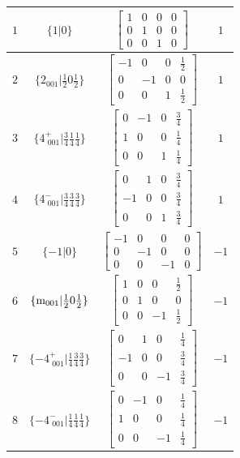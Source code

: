 \documentclass[fleqn,8pt]{jsarticle}
\begin{document}
\begin{longtable}{cccc}
$ 1 $ & $ \{1|0\} $ & $ \begin{bmatrix} 1 & 0 & 0 & 0 \\ 0 & 1 & 0 & 0 \\ 0 & 0 & 1 & 0 \end{bmatrix} $ & $ 1 $ \\ \hline
$ 2 $ & $ \{2{}_{001}|\frac{1}{2} 0 \frac{1}{2}\} $ & $ \begin{bmatrix} -1 & 0 & 0 & \frac{1}{2} \\ 0 & -1 & 0 & 0 \\ 0 & 0 & 1 & \frac{1}{2} \end{bmatrix} $ & $ 1 $ \\ \hline
$ 3 $ & $ \{4^{+}_{\,\,001}|\frac{3}{4} \frac{1}{4} \frac{1}{4}\} $ & $ \begin{bmatrix} 0 & -1 & 0 & \frac{3}{4} \\ 1 & 0 & 0 & \frac{1}{4} \\ 0 & 0 & 1 & \frac{1}{4} \end{bmatrix} $ & $ 1 $ \\ \hline
$ 4 $ & $ \{4^{-}_{\,\,001}|\frac{3}{4} \frac{3}{4} \frac{3}{4}\} $ & $ \begin{bmatrix} 0 & 1 & 0 & \frac{3}{4} \\ -1 & 0 & 0 & \frac{3}{4} \\ 0 & 0 & 1 & \frac{3}{4} \end{bmatrix} $ & $ 1 $ \\ \hline
$ 5 $ & $ \{-1|0\} $ & $ \begin{bmatrix} -1 & 0 & 0 & 0 \\ 0 & -1 & 0 & 0 \\ 0 & 0 & -1 & 0 \end{bmatrix} $ & $ -1 $ \\ \hline
$ 6 $ & $ \{{\rm m}_{001}|\frac{1}{2} 0 \frac{1}{2}\} $ & $ \begin{bmatrix} 1 & 0 & 0 & \frac{1}{2} \\ 0 & 1 & 0 & 0 \\ 0 & 0 & -1 & \frac{1}{2} \end{bmatrix} $ & $ -1 $ \\ \hline
$ 7 $ & $ \{-4^{+}_{\,\,001}|\frac{1}{4} \frac{3}{4} \frac{3}{4}\} $ & $ \begin{bmatrix} 0 & 1 & 0 & \frac{1}{4} \\ -1 & 0 & 0 & \frac{3}{4} \\ 0 & 0 & -1 & \frac{3}{4} \end{bmatrix} $ & $ -1 $ \\ \hline
$ 8 $ & $ \{-4^{-}_{\,\,001}|\frac{1}{4} \frac{1}{4} \frac{1}{4}\} $ & $ \begin{bmatrix} 0 & -1 & 0 & \frac{1}{4} \\ 1 & 0 & 0 & \frac{1}{4} \\ 0 & 0 & -1 & \frac{1}{4} \end{bmatrix} $ & $ -1 $ \\
\end{longtable}
\end{document}

